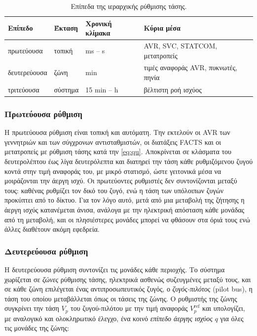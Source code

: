 \begin{table}[!htbp]
\centering
\begin{tabular}{llll}
\hline
Επίπεδο & Έκταση & Χρονική κλίμακα & Κύρια μέσα \\
\hline
πρωτεύουσα   & τοπική  & ms -- s     & AVR, SVC, STATCOM, μετατροπείς \\
δευτερεύουσα & ζώνη    & min         & τιμές αναφοράς AVR, πυκνωτές, πηνία \\
τριτεύουσα   & σύστημα & 15 min -- h & βέλτιστη ροή ισχύος \\
\hline
\end{tabular}
\caption{Επίπεδα της ιεραρχικής ρύθμισης τάσης.}
\label{tab:v-hier}
\end{table}

\subsubsection{Πρωτεύουσα ρύθμιση}

Η πρωτεύουσα ρύθμιση είναι τοπική και αυτόματη. Την εκτελούν οι AVR των γεννητριών και των
σύγχρονων αντισταθμιστών, οι διατάξεις FACTS και οι μετατροπείς με ρύθμιση τάσης κατά την
\eqref{eq:qu}. Αποκρίνεται σε κλάσματα του δευτερολέπτου έως λίγα δευτερόλεπτα και διατηρεί
την τάση κάθε ρυθμιζόμενου ζυγού κοντά στην τιμή αναφοράς του, με μικρό στατισμό, ώστε
γειτονικά μέσα να μοιράζονται την άεργη ισχύ. Οι πρωτεύοντες ρυθμιστές δεν συντονίζονται μεταξύ
τους: καθένας ρυθμίζει τον δικό του ζυγό, ενώ η τάση των υπόλοιπων ζυγών προκύπτει από το
δίκτυο. Για τον λόγο αυτό, μετά από μια μεταβολή της ζήτησης η άεργη ισχύς κατανέμεται άνισα,
ανάλογα με την ηλεκτρική απόσταση κάθε μονάδας από τη μεταβολή, και οι πλησιέστερες μονάδες
μπορεί να φθάσουν στα όριά τους ενώ άλλες διαθέτουν ακόμη εφεδρεία.

\subsubsection{Δευτερεύουσα ρύθμιση}

Η δευτερεύουσα ρύθμιση συντονίζει τις μονάδες κάθε περιοχής. Το σύστημα χωρίζεται σε
\emph{ζώνες} ρύθμισης τάσης, ηλεκτρικά ασθενώς συζευγμένες μεταξύ τους, και σε κάθε ζώνη
επιλέγεται ένας αντιπροσωπευτικός ζυγός, ο \emph{ζυγός-πιλότος} (pilot bus), η τάση του οποίου
μεταβάλλεται όπως οι τάσεις της ζώνης. Ο ρυθμιστής της ζώνης συγκρίνει την τάση $V_p$ του
ζυγού-πιλότου με την τιμή αναφοράς $V_p^{\mathrm{ref}}$ και υπολογίζει, με αναλογικό και
ολοκληρωτικό έλεγχο, ένα κοινό \emph{επίπεδο άεργης ισχύος} $q$ για όλες τις μονάδες της ζώνης:

